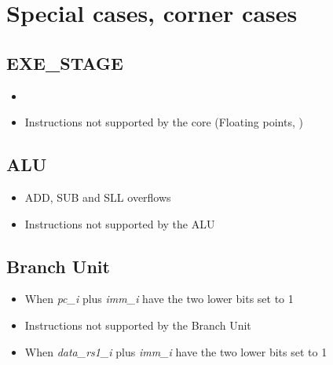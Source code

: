 \section{Special cases, corner cases}

\subsection{EXE\_STAGE }

\begin{itemize}
  \item 
  \item Instructions not supported by the core (Floating points, )
\end{itemize}

\subsection{ALU}

\begin{itemize}
  \item ADD, SUB and SLL overflows
  \item Instructions not supported by the ALU
\end{itemize}

\subsection{Branch Unit}

\begin{itemize}
  \item When \emph{pc\_i} plus \emph{imm\_i} have the two lower bits set to 1
  \item Instructions not supported by the Branch Unit
  \item When \emph{data\_rs1\_i} plus \emph{imm\_i} have the two lower bits set to 1
\end{itemize}